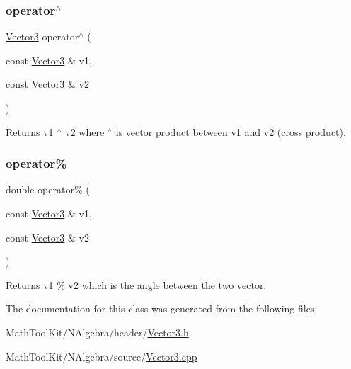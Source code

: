 \subsubsection{\texorpdfstring{operator$^\wedge$}{operator^}}
{\footnotesize\ttfamily \mbox{\hyperlink{class_vector3}{Vector3}} operator$^\wedge$ (\begin{DoxyParamCaption}\item[{const \mbox{\hyperlink{class_vector3}{Vector3}} \&}]{v1,  }\item[{const \mbox{\hyperlink{class_vector3}{Vector3}} \&}]{v2 }\end{DoxyParamCaption})\hspace{0.3cm}{\ttfamily [friend]}}

\begin{DoxyReturn}{Returns}
v1 $^\wedge$ v2 where $^\wedge$ is vector product between v1 and v2 (cross product). 
\end{DoxyReturn}
\mbox{\label{class_vector3_a3ec8a9ae24e8b79b7d6c360af8d9ad38}} 
\subsubsection{\texorpdfstring{operator\%}{operator\%}}
{\footnotesize\ttfamily double operator\% (\begin{DoxyParamCaption}\item[{const \mbox{\hyperlink{class_vector3}{Vector3}} \&}]{v1,  }\item[{const \mbox{\hyperlink{class_vector3}{Vector3}} \&}]{v2 }\end{DoxyParamCaption})\hspace{0.3cm}{\ttfamily [friend]}}

\begin{DoxyReturn}{Returns}
v1 \% v2 which is the angle between the two vector. 
\end{DoxyReturn}


The documentation for this class was generated from the following files\+:\begin{DoxyCompactItemize}
\item 
Math\+Tool\+Kit/\+N\+Algebra/header/\mbox{\hyperlink{_vector3_8h}{Vector3.\+h}}\item 
Math\+Tool\+Kit/\+N\+Algebra/source/\mbox{\hyperlink{_vector3_8cpp}{Vector3.\+cpp}}\end{DoxyCompactItemize}
